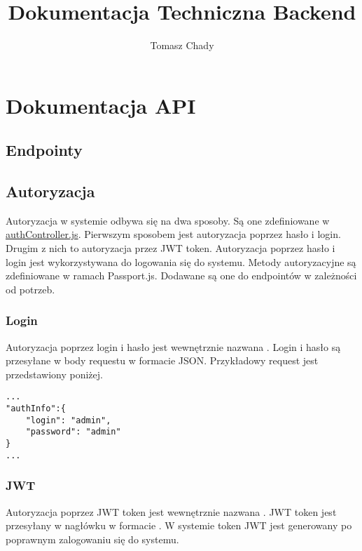 \documentclass{documentation}
\title{Dokumentacja Techniczna Backend}
\author{Tomasz Chady}
\begin{document}
\maketitle

\tableofcontents

\newpage

\section{Dokumentacja API}

\subsection{Endpointy}


\subsection{Autoryzacja}

Autoryzacja w systemie odbywa się na dwa sposoby.
Są one zdefiniowane w \href{https://github.com/Stanlee77/ASSASSIN/blob/master/backend/controllers/authController.js}{authController.js}.
Pierwszym sposobem jest autoryzacja poprzez hasło i login.
Drugim z nich to autoryzacja przez JWT token.
Autoryzacja poprzez hasło i login jest wykorzystywana do logowania się do systemu.
Metody autoryzacyjne są zdefiniowane w ramach Passport.js.
Dodawane są one do endpointów w zależności od potrzeb.

\subsubsection{Login}

Autoryzacja poprzez login i hasło jest wewnętrznie nazwana .
Login i hasło są przesyłane w body requestu w formacie JSON.
Przykładowy request jest przedstawiony poniżej.

\begin{lstlisting}
...
"authInfo":{
    "login": "admin",
    "password": "admin"
}
...
\end{lstlisting}

\subsubsection{JWT}

Autoryzacja poprzez JWT token jest wewnętrznie nazwana .
JWT token jest przesyłany w nagłówku  w formacie .
W systemie token JWT jest generowany po poprawnym zalogowaniu się do systemu.
\end{document}
